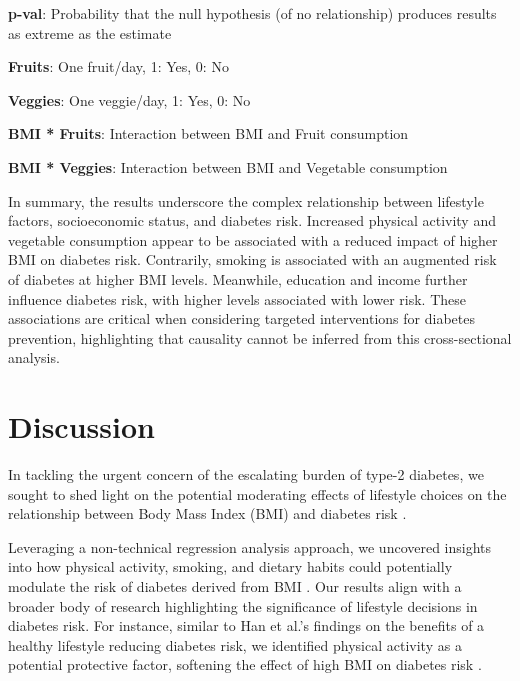 \documentclass[11pt]{article}
\begin{document}
\begin{table}[h]
\begin{threeparttable}
\begin{tablenotes}
\item \textbf{p-val}: Probability that the null hypothesis (of no relationship) produces results as extreme as the estimate
\item \textbf{Fruits}: One fruit/day, 1: Yes, 0: No
\item \textbf{Veggies}: One veggie/day, 1: Yes, 0: No
\item \textbf{BMI * Fruits}: Interaction between BMI and Fruit consumption
\item \textbf{BMI * Veggies}: Interaction between BMI and Vegetable consumption
\end{tablenotes}
\end{threeparttable}
\end{table}


In summary, the results underscore the complex relationship between lifestyle factors, socioeconomic status, and diabetes risk. Increased physical activity and vegetable consumption appear to be associated with a reduced impact of higher BMI on diabetes risk. Contrarily, smoking is associated with an augmented risk of diabetes at higher BMI levels. Meanwhile, education and income further influence diabetes risk, with higher levels associated with lower risk. These associations are critical when considering targeted interventions for diabetes prevention, highlighting that causality cannot be inferred from this cross-sectional analysis.

\section*{Discussion}

In tackling the urgent concern of the escalating burden of type-2 diabetes, we sought to shed light on the potential moderating effects of lifestyle choices on the relationship between Body Mass Index (BMI) and diabetes risk \cite{Chan1994ObesityFD, Reis2011LifestyleFA}. 

Leveraging a non-technical regression analysis approach, we uncovered insights into how physical activity, smoking, and dietary habits could potentially modulate the risk of diabetes derived from BMI \cite{Li2017TimeTO, Schnurr2020ObesityUL}. Our results align with a broader body of research highlighting the significance of lifestyle decisions in diabetes risk. For instance, similar to Han et al.'s findings on the benefits of a healthy lifestyle reducing diabetes risk, we identified physical activity as a potential protective factor, softening the effect of high BMI on diabetes risk \cite{Han2020GeneticRA, Reis2011LifestyleFA}. 
\end{document}
